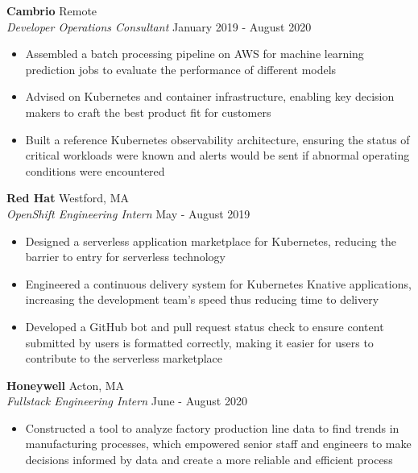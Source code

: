 \documentclass[10pt]{article}
\begin{document}
\begin{flushleft}
	\textbf{Cambrio} \hfill Remote \\
	\textit{Developer Operations Consultant} \hfill January 2019 - August 2020  \\
	\begin{itemize}
		\item Assembled a batch processing pipeline on AWS for machine learning prediction jobs to evaluate the performance of different models

		\item Advised on Kubernetes and container infrastructure, enabling key decision makers to craft the best product fit for customers

		\item Built a reference Kubernetes observability architecture, ensuring the status of critical workloads were known and alerts would be sent if abnormal operating conditions were encountered
	\end{itemize}

	 \textbf{Red Hat} \hfill Westford, MA \\
	 \textit{OpenShift Engineering Intern} \hfill May - August 2019 \\
	 \begin{itemize}
		 \item Designed a serverless application marketplace for Kubernetes, reducing the barrier to entry for serverless technology
		 
		 \item Engineered a continuous delivery system for Kubernetes Knative applications, increasing the development team's speed thus reducing time to delivery
 
		 \item Developed a GitHub bot and pull request status check to ensure content submitted by users is formatted correctly, making it easier for users to contribute to the serverless marketplace
	 \end{itemize}

	\textbf{Honeywell} \hfill Acton, MA \\
	\textit{Fullstack Engineering Intern} \hfill June - August 2020 \\
    \begin{itemize}
        \item Constructed a tool to analyze factory production line data to find trends in manufacturing processes, which empowered senior staff and engineers to make decisions informed by data and create a more reliable and efficient process


\end{itemize}
\end{flushleft}
\end{document}
